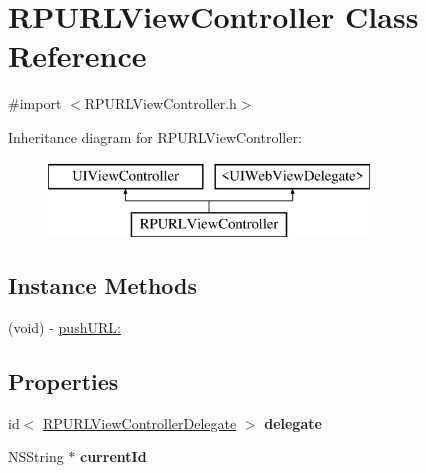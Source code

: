 \hypertarget{interface_r_p_u_r_l_view_controller}{\section{R\-P\-U\-R\-L\-View\-Controller Class Reference}
\label{interface_r_p_u_r_l_view_controller}
}


{\ttfamily \#import $<$R\-P\-U\-R\-L\-View\-Controller.\-h$>$}

Inheritance diagram for R\-P\-U\-R\-L\-View\-Controller\-:\begin{figure}[H]
\begin{center}
\leavevmode
\includegraphics[height=2.000000cm]{interface_r_p_u_r_l_view_controller}
\end{center}
\end{figure}
\subsection*{Instance Methods}
\begin{DoxyCompactItemize}
\item 
(void) -\/ \hyperlink{interface_r_p_u_r_l_view_controller_a1697f711a3895180fa2d20bfa75ecad1}{push\-U\-R\-L\-:}
\end{DoxyCompactItemize}
\subsection*{Properties}
\begin{DoxyCompactItemize}
\item 
\hypertarget{interface_r_p_u_r_l_view_controller_a07a9f8905c6b2f6521294a8de0859273}{id$<$ \hyperlink{protocol_r_p_u_r_l_view_controller_delegate-p}{R\-P\-U\-R\-L\-View\-Controller\-Delegate} $>$ {\bfseries delegate}}\label{interface_r_p_u_r_l_view_controller_a07a9f8905c6b2f6521294a8de0859273}

\item 
\hypertarget{interface_r_p_u_r_l_view_controller_a20e571c4bed31b91b9486224c7b37543}{N\-S\-String $\ast$ {\bfseries current\-Id}}\label{interface_r_p_u_r_l_view_controller_a20e571c4bed31b91b9486224c7b37543}

\end{DoxyCompactItemize}


